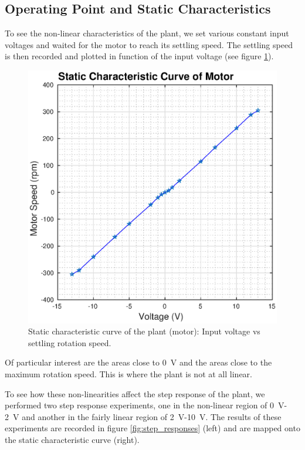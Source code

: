 \subsection{Operating Point and Static Characteristics}

To see the  non-linear  characteristics  of the plant, we set various constant
input voltages and waited for  the  motor  to  reach  its  settling speed. The
settling speed is then recorded and plotted in function of the  input  voltage
(see figure \ref{fig:static_cc}).

\begin{figure}[h]
    \centering
    \includegraphics[width=\linewidth]{images/static_cc}
    \caption{Static characteristic curve of the plant (motor): Input voltage vs settling rotation speed.}
    \label{fig:static_cc}
\end{figure}

Of particular interest  are  the  areas  close  to \SI{0}{\volt} and the areas
close to  the  maximum  rotation  speed. This is where the plant is not at all
linear.

To see  how  these  non-linearities  affect the step response of the plant, we
performed  two  step  response  experiments,  one in the non-linear region  of
\SI{0}{\volt}-\SI{2}{\volt}  and  another  in  the  fairly  linear  region  of
\SI{2}{\volt}-\SI{10}{\volt}. The results of these experiments are recorded in
figure  \ref{fig:step_responses}  (left)  and   are  mapped  onto  the  static
characteristic curve (right).


